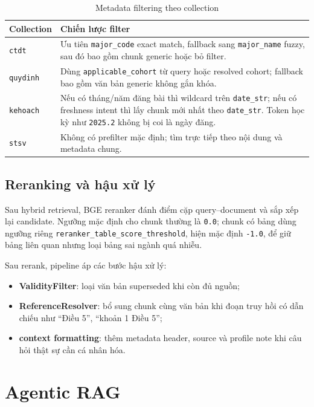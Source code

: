 \documentclass[../DoAn.tex]{subfiles}
\begin{document}
\begin{table}[h]
\centering
\begin{tabular}{|l|p{9.4cm}|}
\hline
\textbf{Collection} & \textbf{Chiến lược filter} \\
\hline
\texttt{ctdt} & Ưu tiên \texttt{major\_code} exact match, fallback sang
\texttt{major\_name} fuzzy, sau đó bao gồm chunk generic hoặc bỏ filter. \\
\hline
\texttt{quydinh} & Dùng \texttt{applicable\_cohort} từ query hoặc resolved
cohort; fallback bao gồm văn bản generic không gắn khóa. \\
\hline
\texttt{kehoach} & Nếu có tháng/năm đăng bài thì wildcard trên
\texttt{date\_str}; nếu có freshness intent thì lấy chunk mới nhất theo
\texttt{date\_str}. Token học kỳ như \texttt{2025.2} không bị coi là ngày đăng. \\
\hline
\texttt{stsv} & Không có prefilter mặc định; tìm trực tiếp theo nội dung và
metadata chung. \\
\hline
\end{tabular}
\caption{Metadata filtering theo collection}
\end{table}

\subsection{Reranking và hậu xử lý}

Sau hybrid retrieval, BGE reranker đánh điểm cặp query--document và sắp xếp lại
candidate. Ngưỡng mặc định cho chunk thường là \texttt{0.0}; chunk có bảng dùng
ngưỡng riêng \texttt{reranker\_table\_score\_threshold}, hiện mặc định
\texttt{-1.0}, để giữ bảng liên quan nhưng loại bảng sai ngành quá nhiễu.

Sau rerank, pipeline áp các bước hậu xử lý:

\begin{itemize}
    \item \textbf{ValidityFilter}: loại văn bản superseded khi còn đủ nguồn;
    \item \textbf{ReferenceResolver}: bổ sung chunk cùng văn bản khi đoạn truy
    hồi có dẫn chiếu như ``Điều 5'', ``khoản 1 Điều 5'';
    \item \textbf{context formatting}: thêm metadata header, source và profile
    note khi câu hỏi thật sự cần cá nhân hóa.
\end{itemize}

\section{Agentic RAG}
\end{document}
